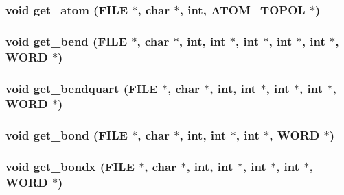 \subsubsection{\setlength{\rightskip}{0pt plus 5cm}void get\_\-atom (FILE $\ast$, char $\ast$, int, {\bf ATOM\_\-TOPOL} $\ast$)}\label{md__proto_8h_b7068d0b7cc8b6600d80a11e1d598780}


\subsubsection{\setlength{\rightskip}{0pt plus 5cm}void get\_\-bend (FILE $\ast$, char $\ast$, int, int $\ast$, int $\ast$, int $\ast$, int $\ast$, {\bf WORD} $\ast$)}\label{md__proto_8h_99768c3e377006134b86e1b4f5180512}


\subsubsection{\setlength{\rightskip}{0pt plus 5cm}void get\_\-bendquart (FILE $\ast$, char $\ast$, int, int $\ast$, int $\ast$, int $\ast$, {\bf WORD} $\ast$)}\label{md__proto_8h_216949f9244d4bd42bfb663cc81e92dd}


\subsubsection{\setlength{\rightskip}{0pt plus 5cm}void get\_\-bond (FILE $\ast$, char $\ast$, int, int $\ast$, int $\ast$, {\bf WORD} $\ast$)}\label{md__proto_8h_d1f910f9fe32eb0c5e764c58ff63def4}


\subsubsection{\setlength{\rightskip}{0pt plus 5cm}void get\_\-bondx (FILE $\ast$, char $\ast$, int, int $\ast$, int $\ast$, int $\ast$, {\bf WORD} $\ast$)}\label{md__proto_8h_dbc3b05b9a1553f38e2c5da75891ee87}


